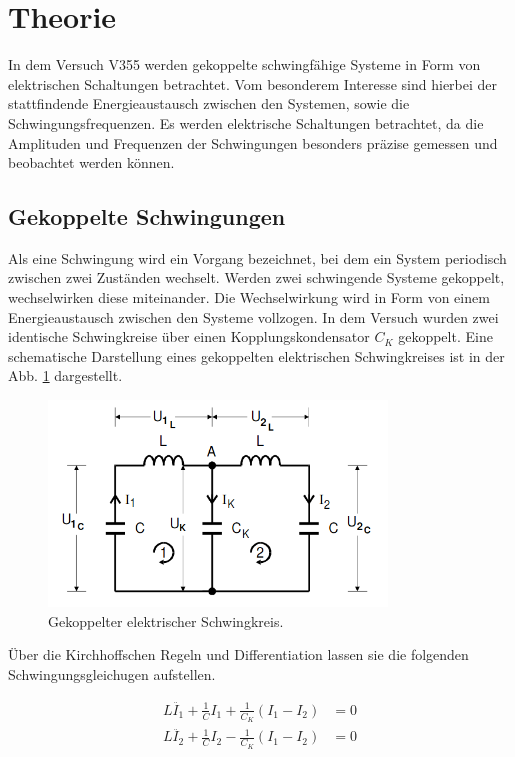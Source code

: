 \setcounter{page}{1}

\section{Theorie}

In dem Versuch V355 werden gekoppelte schwingfähige Systeme in Form von elektrischen
Schaltungen betrachtet. Vom besonderem Interesse sind hierbei der stattfindende
Energieaustausch zwischen den Systemen, sowie die Schwingungsfrequenzen.
Es werden elektrische Schaltungen betrachtet, da die Amplituden und Frequenzen
der Schwingungen besonders präzise gemessen und beobachtet werden können.

\subsection{Gekoppelte Schwingungen}

Als eine Schwingung wird ein Vorgang bezeichnet, bei dem ein System periodisch
zwischen zwei Zuständen wechselt. Werden zwei schwingende Systeme gekoppelt,
wechselwirken diese miteinander. Die Wechselwirkung wird in Form von einem
Energieaustausch zwischen den Systeme vollzogen. In dem Versuch wurden zwei identische
Schwingkreise über einen Kopplungskondensator $C_K$ gekoppelt. Eine schematische
Darstellung eines gekoppelten elektrischen Schwingkreises ist in der Abb.
\ref{fig:gekoppelterSchwingkreis} dargestellt.

\begin{figure}
  \centering
  \includegraphics[width=9cm]{V355_allg_Schwingkreis.png}
  \caption{Gekoppelter elektrischer Schwingkreis.\cite{anleitung01}\protect}
  \label{fig:gekoppelterSchwingkreis}
\end{figure}

Über die Kirchhoffschen Regeln und Differentiation lassen sie die folgenden
Schwingungsgleichugen aufstellen.

\begin{align}
  \label{eqn:DGL_1}
  L\ddot{I_1} + \frac{1}{C}I_1+\frac{1}{C_K}\left(I_1 - I_2 \right) &= 0\\
  \label{eqn:DGL_2}
  L\ddot{I_2} + \frac{1}{C}I_2-\frac{1}{C_K}\left(I_1 - I_2 \right) &= 0
\end{align}

